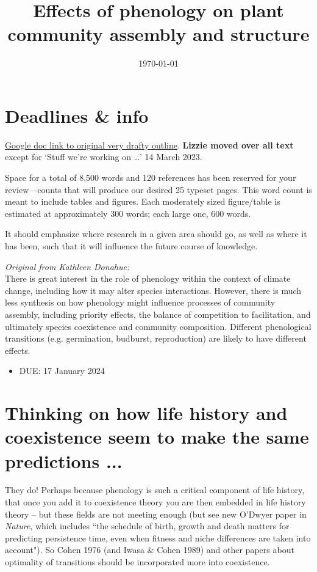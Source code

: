 \documentclass[11pt]{article}
\begin{document}


\title{Effects of phenology on plant community assembly and structure }
\author{}
\date{\today}
\maketitle
\tableofcontents

\section{Deadlines \& info}
\href{https://docs.google.com/document/d/1hSAbi-9lcc7Pek-CGSs_uZRHI6SD3DPK_fiHJ8Rkz7Y/edit?usp=sharing}{Google doc link to original very drafty outline}. {\bf Lizzie moved over all text} except for `Stuff we’re working on …' 14 March 2023. 

Space for a total of 8,500 words and 120 references has been reserved for your review—counts that will produce our desired 25 typeset pages. This word count is meant to include tables and figures. Each moderately sized figure/table is estimated at approximately 300 words; each large one, 600 words.

It should emphasize where research in a given area should go, as well as where it has been, such that it will influence the future course of knowledge. 

\emph{Original from Kathleen Donahue: }\\
There is great interest in the role of phenology within the context of climate change, including how it may alter species interactions. However, there is much less synthesis on how phenology might influence processes of community assembly, including priority effects, the balance of competition to facilitation, and ultimately species coexistence and community composition. Different phenological transitions (e.g. germination, budburst, reproduction) are likely to have different effects.


\begin{itemize}
\item DUE: 17 January 2024
\end{itemize}

\section{Thinking on how life history and coexistence seem to make the same predictions ...}
They do! Perhaps because phenology is such a critical component of life history, that once you add it to coexistence theory you are then embedded in life history theory -- but these fields are not meeting enough (but see new O'Dwyer paper in \emph{Nature}, which includes ``the schedule of birth, growth and death matters for predicting persistence time, even when fitness and niche differences are taken into account"). So Cohen 1976 (and Iwasa \& Cohen 1989) and other papers about optimality of transitions should be incorporated more into coexistence. 
\end{document}
